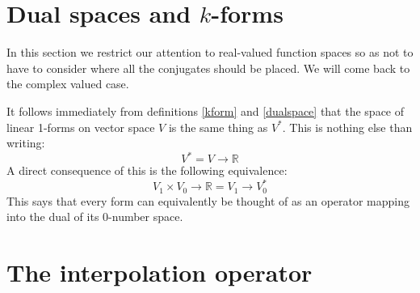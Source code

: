 \documentclass[a4paper,11pt]{article}
\begin{document}
\section{Dual spaces and $k$-forms}

In this section we restrict our attention to real-valued function spaces so as not to have to consider where all the conjugates should be placed. We will come back to the complex valued case.

It follows immediately from definitions \ref{kform} and \ref{dualspace} that the space of linear 1-forms on vector space $V$ is the same thing as $V^*$. This is nothing else than writing:
\begin{equation} 
    V^* = V\rightarrow \mathbb{R}
\end{equation} 
A direct consequence of this is the following equivalence:
\begin{equation} 
    V_1 \times V_0 \rightarrow \mathbb{R} = V_1 \rightarrow V_0^*
\end{equation}
This says that every form can equivalently be thought of as an operator mapping into the dual of its 0-number space.

\section{The interpolation operator}
\end{document}
